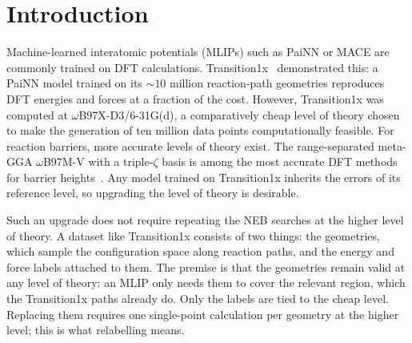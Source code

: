 
\chapter{Introduction}
\label{ch:introduction}


Machine-learned interatomic potentials (MLIPs) such as PaiNN or MACE
are commonly trained on DFT calculations. Transition1x~\cite{schreiner2022} demonstrated this: a
PaiNN model trained on its ${\sim}10$ million reaction-path geometries
reproduces DFT energies and forces at a fraction of the cost. However,
Transition1x was computed at \mbox{$\omega$B97X-D3/6-31G(d)}, a
comparatively cheap level of theory chosen to make the generation of
ten million data points computationally feasible. For reaction
barriers, more accurate levels of theory exist. The range-separated
meta-GGA $\omega$B97M-V with a triple-$\zeta$ basis is among the most
accurate DFT methods for barrier heights~\cite{mardirossian2016,
goerigk2017}. Any model trained on Transition1x inherits the errors of
its reference level, so upgrading the level of theory is desirable.

Such an upgrade does not require repeating the NEB searches at the
higher level of theory. A dataset like Transition1x consists of two
things: the geometries, which sample the configuration space along
reaction paths, and the energy and force labels attached to them. The
premise is that the geometries remain valid at any level of theory:
an MLIP only needs them to cover the relevant region, which the
Transition1x paths already do. Only the labels are tied to the cheap
level. Replacing them requires one single-point calculation per
geometry at the higher level; this is what relabelling means.

